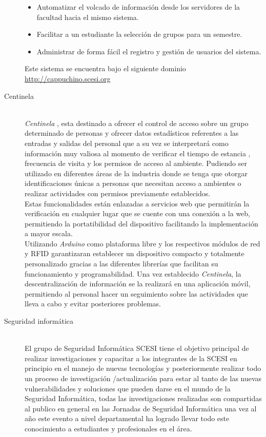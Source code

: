\documentclass[11pt,letterpaper]{article}
\begin{document}
\begin{description}
		\begin{itemize}
			\item Automatizar el volcado de información desde los servidores de la facultad hacia el mismo sistema.
			\item Facilitar a un estudiante la selección de grupos para un semestre.
			\item Administrar de forma fácil el registro y gestión de usuarios del sistema.
		\end{itemize}
		Este sistema se encuentra bajo el siguiente dominio \url{http://cappuchino.scesi.org}
	\item[Centinela]~\\
		\textit{Centinela} , esta destinado a ofrecer el control de acceso sobre un grupo determinado de personas y ofrecer datos estadísticos referentes a las entradas y salidas del personal que a su vez se interpretará como informaci\'on muy valiosa al momento de verificar el tiempo de estancia , frecuencia de visita y los permisos de acceso al ambiente.  Pudiendo ser utilizado en diferentes \'areas de la industria donde se tenga que otorgar identificaciones \'unicas a personas que necesitan acceso a ambientes o realizar actividades con permisos previamente establecidos. \\
		Estas funcionalidades est\'an enlazadas a servicios web que permitir\'an la verificaci\'on en cualquier lugar que se cuente con una conexi\'on a la web, permitiendo la portatibilidad del dispositivo facilitando la implementaci\'on a mayor escala.\\
		Utilizando \textit{Arduino} como plataforma libre y los respectivos m\'odulos de red y RFID garantizaran establecer un dispositivo compacto y totalmente personalizado gracias a las diferentes librer\'ias que facilitan su funcionamiento y programabilidad. Una vez establecido \textit{Centinela}, la descentralizaci\'on de informaci\'on se la realizará en una aplicaci\'on m\'ovil, permitiendo al personal hacer un seguimiento sobre las actividades que lleva a cabo y evitar posteriores problemas.\\
	\item[Seguridad informática]~\\
		El grupo de Seguridad Informática SCESI tiene el objetivo principal de realizar investigaciones y capacitar a los integrantes de la SCESI en principio en el manejo de nuevas tecnologías y posteriormente realizar todo un proceso de investigación /actualización para estar al tanto de las nuevas vulnerabilidades y soluciones que pueden darse en el mundo de la Seguridad Informática, todas las investigaciones realizadas son compartidas al publico en general en las Jornadas de Seguridad Informática una vez al año este evento a nivel departamental ha logrado llevar todo este conocimiento a estudiantes y profesionales en el área.

\end{description}
\end{document}
